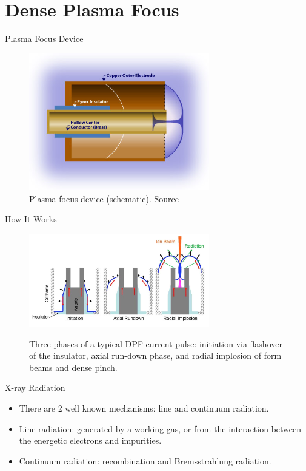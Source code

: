 \section{Dense Plasma Focus}
\begin{frame} {Plasma Focus Device}
    \begin{figure}
        \centering
        \includegraphics[width=0.7\textwidth]{figures/dfp-device.jpg}
        \caption{Plasma focus device (schematic). Source \cite{plasmauniverse_dense_plasma}}
        \label{fig:dfp-device}
    \end{figure}
\end{frame}

\begin{frame} {How It Works}
    \begin{figure}
        \centering
        \href{https://youtube.com/clip/UgkxWF4zfWfsoU7Gar1u_J0bT1FXJGZnnXn0?si=M5IRMIMCRzouIu3N}{
            \includegraphics[width=0.7\textwidth]{figures/dfp-phases.png}
        }
        \caption{Three phases of a typical DPF current pulse: initiation via flashover of the insulator, axial run-down phase, and radial implosion of form beams and dense pinch. \cite{krishnan_2012_dense}}
        \label{fig:dfp-phases}
    \end{figure}
\end{frame}

\begin{frame} {X-ray Radiation}
    \begin{itemize}
        \item There are 2 well known mechanisms: line and continuum radiation.
        \item Line radiation: generated by a working gas, or from the interaction between the energetic electrons and impurities.
        \item Continuum radiation: recombination and Bremsstrahlung radiation.
    \end{itemize}
\end{frame}

